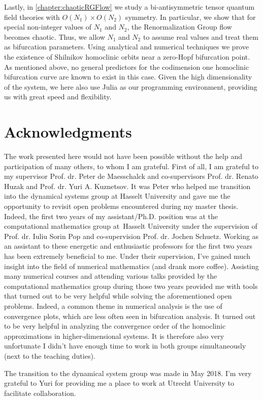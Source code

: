 Lastly, in \cref{chapter:chaoticRGFlow} we study a bi-antisymmetric tensor
quantum field theories with $O(N_1)\times O(N_2)$ symmetry. In particular, we
show that for special non-integer values of $N_1$ and $N_2$, the
Renormalization Group flow becomes chaotic. Thus, we allow $N_1$ and $N_2$ to
assume real values and treat them as bifurcation parameters. Using analytical
and numerical techniques we prove the existence of Shilnikov homoclinic orbits
near a zero-Hopf bifurcation point. As mentioned above, no general predictors
for the codimension one homoclinic bifurcation curve are known to exist in this
case. Given the high dimensionality of the system, we here also use Julia as
our programming environment, providing us with great speed and flexibility.


\section{Acknowledgments}
The work presented here would not have been possible without the help and
participation of many others, to whom I am grateful. First of all, I am
grateful to my supervisor Prof. dr. Peter de Maesschalck and co-supervisors
Prof. dr. Renato Huzak and Prof. dr. Yuri A. Kuznetsov. It was Peter who helped
me transition into the dynamical systems group at Hasselt University and gave
me the opportunity to revisit open problems encountered during my master
thesis. Indeed, the first two years of my assistant/Ph.D. position was at the
computational mathematics group at Hasselt University under the supervision of
Prof. dr. Iuliu Sorin Pop and co-supervision Prof. dr. Jochen Schuetz. Working
as an assistant to these energetic and enthusiastic professors for the first
two years has been extremely beneficial to me. Under their supervision, I've
gained much insight into the field of numerical mathematics (and drank more
coffee). Assisting many numerical courses and attending various talks provided
by the computational mathematics group during those two years provided me with
tools that turned out to be very helpful while solving the aforementioned open
problems. Indeed, a common theme in numerical analysis is the use of
convergence plots, which are less often seen in bifurcation analysis. It turned
out to be very helpful in analyzing the convergence order of the homoclinic
approximations in higher-dimensional systems. It is therefore also very
unfortunate I didn't have enough time to work in both groups simultaneously
(next to the teaching duties).

The transition to the dynamical system group was made in May 2018. I'm very
grateful to Yuri for providing me a place to work at Utrecht University to
facilitate collaboration.

